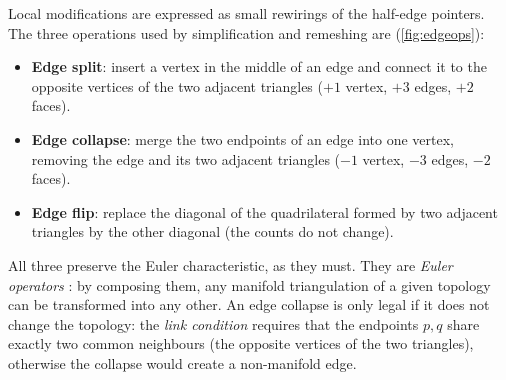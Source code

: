 Local modifications are expressed as small rewirings of the half-edge pointers. The three
operations used by simplification and remeshing are (\cref{fig:edgeops}):
\begin{itemize}
  \item \textbf{Edge split}: insert a vertex in the middle of an edge and connect it to the
  opposite vertices of the two adjacent triangles ($+1$ vertex, $+3$ edges, $+2$ faces).
  \item \textbf{Edge collapse}: merge the two endpoints of an edge into one vertex, removing the
  edge and its two adjacent triangles ($-1$ vertex, $-3$ edges, $-2$ faces).
  \item \textbf{Edge flip}: replace the diagonal of the quadrilateral formed by two adjacent
  triangles by the other diagonal (the counts do not change).
\end{itemize}
All three preserve the Euler characteristic, as they must. They are \emph{Euler operators}
\citep{Mantyla1988}: by composing them, any manifold triangulation of a given topology can be
transformed into any other. An edge collapse is only legal if it does not change the topology: the
\emph{link condition} requires that the endpoints $p,q$ share exactly two common neighbours (the
opposite vertices of the two triangles), otherwise the collapse would create a non-manifold edge.

